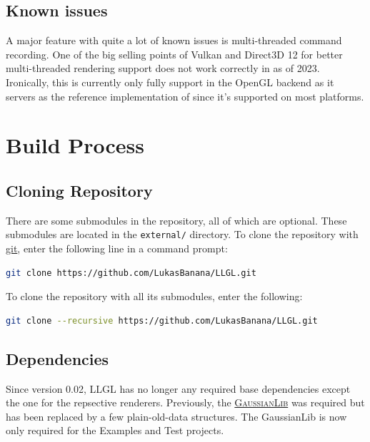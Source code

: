 \documentclass{article}
\begin{document}
\subsection{Known issues}
A major feature with quite a lot of known issues is multi-threaded command recording.
One of the big selling points of Vulkan and Direct3D 12 for better multi-threaded rendering support does not work correctly in \LLGL as of 2023.
Ironically, this is currently only fully support in the OpenGL backend as it servers as the reference implementation of \LLGL since it's supported on most platforms.



\newpage
\section{Build Process}

\subsection{Cloning Repository}

There are some submodules in the \LLGL repository, all of which are optional.
These submodules are located in the \texttt{external/} directory.
To clone the repository with \href{https://git-scm.com/}{git}, enter the following line in a command prompt:
\begin{lstlisting}[language=sh]
git clone https://github.com/LukasBanana/LLGL.git
\end{lstlisting}
To clone the repository with all its submodules, enter the following:
\begin{lstlisting}[language=sh]
git clone --recursive https://github.com/LukasBanana/LLGL.git
\end{lstlisting}

\subsection{Dependencies}

Since version 0.02, LLGL has no longer any required base dependencies except the one for the repsective renderers.
Previously, the \href{https://github.com/LukasBanana/GaussianLib}{\textsc{GaussianLib}} was required but has been replaced by a few plain-old-data structures.
The GaussianLib is now only required for the Examples and Test projects.
\end{document}
